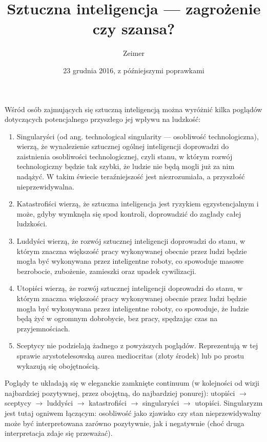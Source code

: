 \documentclass[10pt,a4paper]{article}
\begin{document}
	\title{Sztuczna inteligencja — zagrożenie czy szansa?}
	\author{Zeimer}
	\date{23 grudnia 2016, z późniejszymi poprawkami}
	\maketitle
	
	\par Wśród osób zajmujących się sztuczną inteligencją można wyróżnić kilka poglądów dotyczących potencjalnego przyszłego jej wpływu na ludzkość:
	\begin{enumerate}
		\item Singularyści (od ang. technological singularity — osobliwość technologiczna), wierzą, że wynalezienie sztucznej ogólnej inteligencji doprowadzi do zaistnienia osobliwości technologicznej, czyli stanu, w którym rozwój technologiczny będzie tak szybki, że ludzie nie będą mogli już za nim nadążyć. W takim świecie teraźniejszość jest niezrozumiała, a przyszłość nieprzewidywalna.
		\item Katastrofiści wierzą, że sztuczna inteligencja jest ryzykiem egzystencjalnym i może, gdyby wymknęła się spod kontroli, doprowadzić do zagłady całej ludzkości.
		\item Luddyści wierzą, że rozwój sztucznej inteligencji doprowadzi do stanu, w którym znaczna większość pracy wykonywanej obecnie przez ludzi będzie mogła być wykonywana przez inteligentne roboty, co spowoduje masowe bezrobocie, zubożenie, zamieszki oraz upadek cywilizacji.
		\item Utopiści wierzą, że rozwój sztucznej inteligencji doprowadzi do stanu, w którym znaczna większość pracy wykonywanej obecnie przez ludzi będzie mogła być wykonywana przez inteligentne roboty, co spowoduje, że ludzie będą żyć w ogromnym dobrobycie, bez pracy, spędzając czas na przyjemnościach.
		\item Sceptycy nie podzielają żadnego z powyższych poglądów. Reprezentują w tej sprawie arystotelesowską aurea mediocritas (złoty środek) lub po prostu wykazują się obojętnością.
	\end{enumerate}
	\par Poglądy te układają się w eleganckie zamknięte continuum (w kolejności od wizji najbardziej pozytywnej, przez obojętną, do najbardziej ponurej): utopiści $\to$ sceptycy $\to$ luddyści $\to$ katastrofiści $\to$ singularyści $\to$ utopiści. Singularyzm jest tutaj ogniwem łączącym: osobliwość jako zjawisko czy stan nieprzewidywalny może być interpretowana zarówno pozytywnie, jak i negatywnie (choć druga interpretacja zdaje się przeważać).
\end{document}
